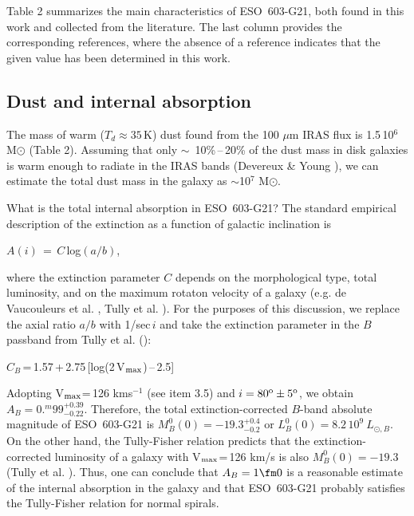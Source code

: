 \documentclass{aa}
\begin{document}
Table 2 summarizes the main characteristics of ESO~603-G21, both found
in this  work and  collected  from the  literature.  The  last  column
provides  the  corresponding   references,  where  the  absence  of  a
reference  indicates that the given value has been  determined in this
work.

\subsection{Dust and internal absorption}

The mass of warm ($T_d \approx  35$\,K) dust found from the 100 $\mu$m
IRAS flux is  1.5\,10$^6$  M$\odot$  (Table  2).  Assuming  that  only
$\sim$~10\%\,--\,20\% of the dust mass in disk galaxies is warm enough
to radiate in the IRAS bands  (Devereux  \& Young  \cite{dy}),  we can
estimate the total dust mass in the galaxy as $\sim$10$^7$ M$\odot$.

What is the total internal absorption in ESO~603-G21? The standard empirical
description of the extinction as a function of galactic inclination is 
\begin{center}
$A(i)\,=\,C$\,log$(a/b)$, 
\end{center}
where the extinction parameter $C$ depends
on the morphological type, total luminosity, and on the maximum
rotaton velocity of a galaxy (e.g. de Vaucouleurs et al. \cite{dV},
Tully et al. \cite{tt}). For the purposes of this discussion, we 
replace the axial ratio $a/b$ with 1/sec\,$i$ and take the extinction
parameter in the $B$ passband from Tully et al. (\cite{tt}):
\begin{center}
$C_B$\,=\,1.57\,+\,2.75\,[log(2\,V$_{\rm max}$)\,--\,2.5] 
\end{center}

Adopting V$_{\rm max}$=\,126  kms$^{-1}$ (see item 3.5) and $i=80^{\rm
o}  \pm  5^{\rm  o}$,  we  obtain   $A_B  =   0.^m99^{+0.39}_{-0.22}$.
Therefore, the total extinction-corrected  $B$-band absolute magnitude
of     ESO~603-G21      is      $M_B^0(0)=-19.3^{+0.4}_{-0.2}$      or
$L_B^0(0)=8.2\,10^9~L_{\odot,B}$.  On the other hand, the Tully-Fisher
relation predicts that the extinction-corrected luminosity of a galaxy
with V$_{\rm max}$=\,126 km/s is also  $M_B^0(0)=-19.3$  (Tully et al.
\cite{tt}).  Thus, one can conclude that  $A_B=1\fm0$  is a reasonable
estimate of the internal absorption in the galaxy and that ESO~603-G21
probably satisfies the Tully-Fisher relation for normal spirals.
\end{document}
